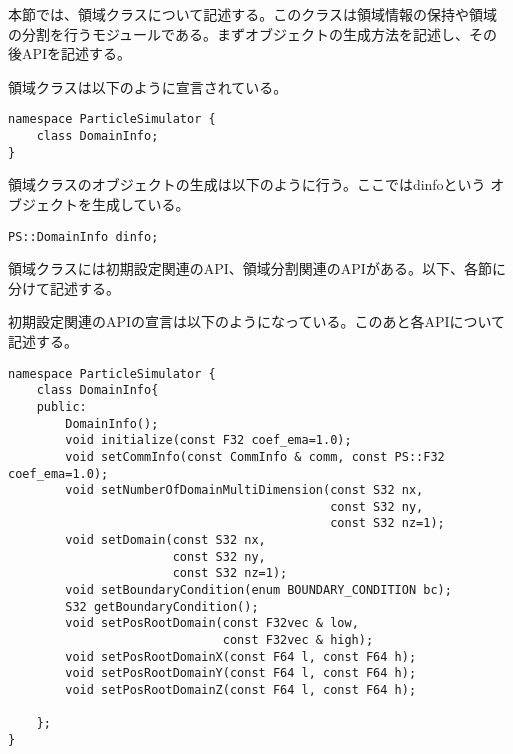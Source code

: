 本節では、領域クラスについて記述する。このクラスは領域情報の保持や領域
の分割を行うモジュールである。まずオブジェクトの生成方法を記述し、その
後APIを記述する。


領域クラスは以下のように宣言されている。
\begin{lstlisting}[caption=DomainInfo0]
namespace ParticleSimulator {
    class DomainInfo;
}
\end{lstlisting}

領域クラスのオブジェクトの生成は以下のように行う。ここではdinfoという
オブジェクトを生成している。
\begin{screen}
\begin{verbatim}
PS::DomainInfo dinfo;
\end{verbatim}
\end{screen}


領域クラスには初期設定関連のAPI、領域分割関連のAPIがある。以下、各節に
分けて記述する。


初期設定関連のAPIの宣言は以下のようになっている。このあと各APIについて
記述する。
\begin{lstlisting}[caption=DomainInfo1]
namespace ParticleSimulator {
    class DomainInfo{
    public:
        DomainInfo();
        void initialize(const F32 coef_ema=1.0);
        void setCommInfo(const CommInfo & comm, const PS::F32 coef_ema=1.0);
        void setNumberOfDomainMultiDimension(const S32 nx,
                                             const S32 ny,
                                             const S32 nz=1);
        void setDomain(const S32 nx,
                       const S32 ny,
                       const S32 nz=1);
        void setBoundaryCondition(enum BOUNDARY_CONDITION bc);
        S32 getBoundaryCondition();
        void setPosRootDomain(const F32vec & low,
                              const F32vec & high);
        void setPosRootDomainX(const F64 l, const F64 h);
        void setPosRootDomainY(const F64 l, const F64 h);
        void setPosRootDomainZ(const F64 l, const F64 h);
                              
    };
}
\end{lstlisting}

